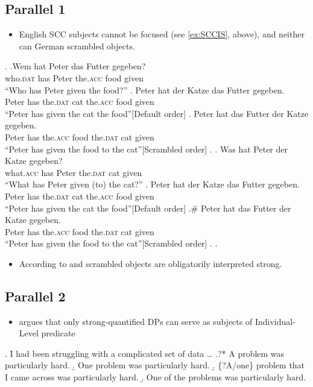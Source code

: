 \documentclass[letterpaper]{article}
\begin{document}
\subsection{Parallel 1}
\begin{itemize}
  \item English SCC subjects cannot be focused (see \ref{ex:SCCIS}, above), and neither can German scrambled objects. \parencite{lenerz1977zur}
\end{itemize}
\ex.
\ag.Wem hat Peter das Futter gegeben?\\
who.\textsc{dat} has Peter the.\textsc{acc} food given\\
``Who has Peter given the food?''
\ag. Peter hat der Katze das Futter gegeben.\\
Peter has the.\textsc{dat} cat the.\textsc{acc} food given\\
``Peter has given the cat the food''\hfill[Default order]
\bg. Peter hat das Futter der Katze gegeben.\\
Peter has the.\textsc{acc} food the.\textsc{dat} cat given\\
``Peter has given the food to the cat''\hfill[Scrambled order]
\z.
\bg. Was hat Peter der Katze gegeben?\\
what.\textsc{acc} has Peter the.\textsc{dat} cat given\\
``What has Peter given (to) the cat?''
\ag. Peter hat der Katze das Futter gegeben.\\
Peter has the.\textsc{dat} cat the.\textsc{acc} food given\\
``Peter has given the cat the food''\hfill[Default order]
\bg.\# Peter hat das Futter der Katze gegeben.\\
Peter has the.\textsc{acc} food the.\textsc{dat} cat given\\
``Peter has given the food to the cat''\hfill[Scrambled order]
\z.
\z.

\begin{itemize}
  \item According to \textcite{dehoop1992case} and \textcite{diesing1992indefinites} scrambled objects are obligatorily interpreted strong.
\end{itemize}
\subsection{Parallel 2}
\begin{itemize}
  \item \textcite{milsark1974existential} argues that only strong-quantified DPs can serve as subjects of Individual-Level predicate
\end{itemize}
\ex. I had been struggling with a complicated set of data \ldots
\a.?* A problem was particularly hard.
\b. One problem was particularly hard.
\b. \{?A/one\} problem that I came across was particularly hard.
\b. One of the problems was particularly hard.\hfill\parencite{heycock2012specification}
\end{document}
